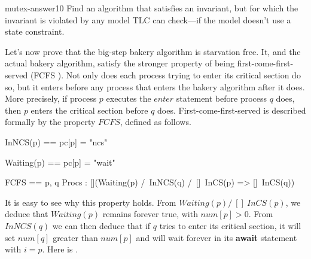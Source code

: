 \documentclass[fleqn,leqno]{article}
\begin{document}
\begin{aquestion}{mutex-answer10}
Find an algorithm that satisfies an invariant, but for which the
invariant is violated by any model TLC can check---if the model doesn't
use a state constraint.
\end{aquestion}
%
Let's now prove that the big-step bakery algorithm is starvation free.
It, and the actual bakery algorithm, satisfy the stronger property of
being first-come-first-served%
(FCFS%
  ).  
Not only does each process trying to enter its critical section do so,
but it enters before any process that enters the bakery algorithm
after it does.  More precisely, if process $p$ executes the $enter$
statement before process $q$ does, then $p$ enters the critical
section before $q$ does.  First-come-first-served is described
formally by the property $FCFS$, defined as follows.
\begin{display}
\begin{notla}
InNCS(p)   == pc[p] = "ncs"

Waiting(p) == pc[p] = "wait"

FCFS  == 
   \A p, q \in Procs : 
       [](Waiting(p)  /\  InNCS(q)  /\  []~InCS(p)  =>  []~InCS(q))
\end{notla}
\begin{tlatex}
%
\@pvspace{4.0pt}%
%
\@pvspace{4.0pt}%
%
%
\end{tlatex}
\end{display}
It is easy to see why this property holds.  From 
  $Waiting(p) /\ []~InCS(p)$, we deduce that $Waiting(p)$ remains
forever true, with $num[p]>0$.  From $InNCS(q)$ we can then deduce
that if $q$ tries to enter its critical section, it will set $num[q]$
greater than $num[p]$ and will wait forever in its \textbf{await}
statement with $i=p$.  Here is .
\end{document}
